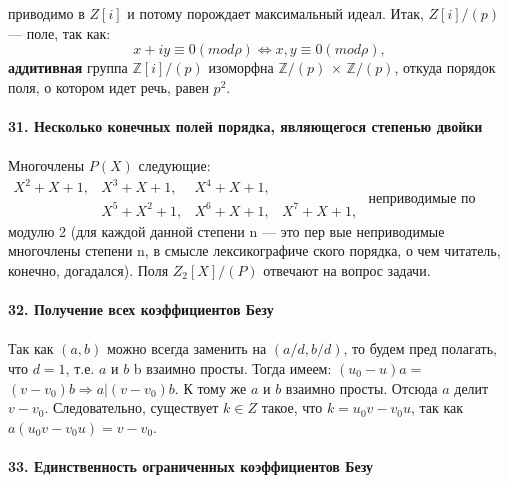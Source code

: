 приводимо в $Z[i]$ и потому порождает максимальный идеал. Итак,\linebreak
$Z[i]/(p)$ ---  поле, так как:
$$x + iy \equiv 0 (mod \rho) \Longleftrightarrow x, y \equiv 0 (mod \rho ),$$
\textbf{аддитивная} группа $\mathbb{Z}[i]/(p)$  изоморфна $\mathbb{Z}/(p)$ $\times$ $\mathbb{Z}/(p)$, откуда порядок\linebreak
поля, о котором идет речь, равен $p^{2}$.\\
\\
\noindent\textbf{31. Несколько конечных полей порядка, являющегося\linebreak
степенью двойки}\\
\\
Многочлены $P(X)$ следующие:\\
			$\begin{array}{llll}
							 X^2 + X + 1,   & X^3 + X + 1,   & X^4 + X + 1,\\ 

			                          & X^5 + X^2 + 1, & X^6 + X + 1, & X^7 + X + 1, 
			\end{array}$
\newpage
\noindent неприводимые по модулю 2 (для каждой данной степени n --- это пер­\linebreak 
вые неприводимые многочлены степени n, в смысле лексикографиче­\linebreak
ского порядка, о чем читатель, конечно, догадался). Поля $Z_2[X]/(P)$\linebreak
отвечают на вопрос задачи.\\
\\
\noindent\textbf{32. Получение всех коэффициентов Безу}\\
\\
\hspace*{15pt} Так как $(a, b)$ можно всегда заменить на $(a/d, b/d)$, то будем пред­\linebreak
полагать, что $d = 1$, т.е. $a$ и $b$ b взаимно просты. Тогда имеем: $(u_0 - u)a =$ \linebreak
$(v - v_0)b \Rightarrow a | (v - v_0)b$. К тому же $a$ и $b$  взаимно просты. Отсюда $a$\linebreak
делит $v - v_0$. Следовательно, существует $k \in Z$ такое, что $k = u_0v - v_0u$,\linebreak
так как $a(u_0v - v_0u) = v - v_0$.\\
\\
\noindent\textbf{33. Единственность ограниченных коэффициентов Безу}\\
